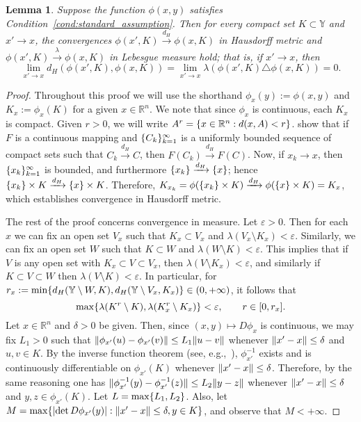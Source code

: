 \documentclass[11pt,onecolumn]{IEEEtran}  %
\newcommand{\Rb}{\mathbb{R}}
\newcommand{\Yb}{\mathbb{Y}}
\newcommand{\hto}{\xrightarrow{d_H}}
\newcommand{\lto}{\xrightarrow{\lambda}}
\newcommand{\defeq}{:=}%
\DeclarePairedDelimiter{\set}{\{}{\}}
\DeclarePairedDelimiter{\abs}{|}{|}
\DeclarePairedDelimiter{\norm}{\|}{\|}
\newtheorem{lemma}{Lemma}
\theoremstyle{definition}
\begin{document}
\begin{lemma} \label{lem:images_converge_in_measure}
    Suppose the function $\phi(x,y)$ satisfies Condition~\ref{cond:standard_assumption}. Then for every compact set $K \subset \Yb$ and $x' \to x$, the convergences $\phi(x', K) \hto \phi(x,K)$ in Hausdorff metric and $\phi(x', K) \lto \phi(x, K)$ in Lebesgue measure hold; that is, if $x' \to x$, then
    \begin{equation}
        \lim_{x' \to x} d_H( \phi(x', K), \phi(x, K)) =
        \lim_{x' \to x} \lambda( \phi(x', K) \triangle \phi(x, K)) = 0.
    \end{equation}
\end{lemma}

\begin{proof}
    Throughout this proof we will use the shorthand $\phi_x(y) \defeq \phi(x,y)$ and $K_x \defeq \phi_x(K)$ for a given $x \in \Rb^n$. We note that since $\phi_x$ is continuous, each $K_x$ is compact. Given $r > 0$, we will write $A^r = \set{x \in \Rb^n : d(x,A) < r}$. \citet[Theorem 4.26, see also p. 138]{rockafellar_variational_2009} show that if $F$ is a continuous mapping and $\set{C_k}_{k=1}^{\infty}$ is a uniformly bounded sequence of compact sets such that $C_k \hto C$, then $F(C_k) \hto F(C)$. Now, if $x_k \to x$, then $\set{x_k}_{k=1}^{\infty}$ is bounded, and furthermore $\set{x_k} \hto \set{x}$; hence $\set{x_k} \times K \hto \set{x} \times K$. Therefore, $K_{x_k} = \phi(\set{x_k} \times K) \hto \phi(\set{x} \times K) = K_x$, which establishes convergence in Hausdorff metric.

    The rest of the proof concerns convergence in measure. Let $\varepsilon > 0$. Then for each $x$ we can fix an open set $V_x$ such that $K_x \subset V_x$ and $\lambda(V_x \setminus K_x) < \varepsilon$. Similarly, we can fix an open set $W$ such that $K \subset W$ and $\lambda(W \setminus K) < \varepsilon$. This implies that if $V$ is any open set with $K_x \subset V \subset V_x$, then $\lambda(V \setminus K_x) < \varepsilon$, and similarly if $K \subset V \subset W$ then $\lambda(V \setminus K) < \varepsilon$. In particular, for $r_x \defeq \min\set{d_H(\Yb \setminus W, K), d_H(\Yb \setminus V_x, K_x)} \in (0, +\infty)$, it follows that
    \begin{equation} \label{eq:lem_hausdorff_eq1}
        \max\set{\lambda(K^r \setminus K), \lambda(K_x^r \setminus K_x)} < \varepsilon, \qquad r \in [0, r_x].
    \end{equation}
    Let $x \in \Rb^n$ and $\delta > 0$ be given. Then, since $(x,y) \mapsto D \phi_x$ is continuous, we may fix $L_1 > 0$ such that $\norm{\phi_{x'}(u) - \phi_{x'}(v)} \leq L_1 \norm{u-v}$ whenever $\norm{x'-x} \leq \delta$ and $u, v \in K$. By the inverse function theorem (see, e.g.,~\cite[Theorem 9.24]{walter_rudin_1953}), $\phi_{x'}^{-1}$ exists and is continuously differentiable on $\phi_{x'}(K)$ whenever $\norm{x'-x} \leq \delta$. Therefore, by the same reasoning one has $\norm{\phi_{x'}^{-1}(y) - \phi_{x'}^{-1}(z)} \leq L_2 \norm{y-z}$ whenever $\norm{x'-x} \leq \delta$ and $y, z \in \phi_{x'}(K)$. Let $L = \max\set{L_1, L_2}$. Also, let $M = \max\set{\abs{\det D \phi_{x'}(y)} : \norm{x'-x} \leq \delta, y \in K}$, and observe that $M < +\infty$.


\end{proof}
\end{document}
